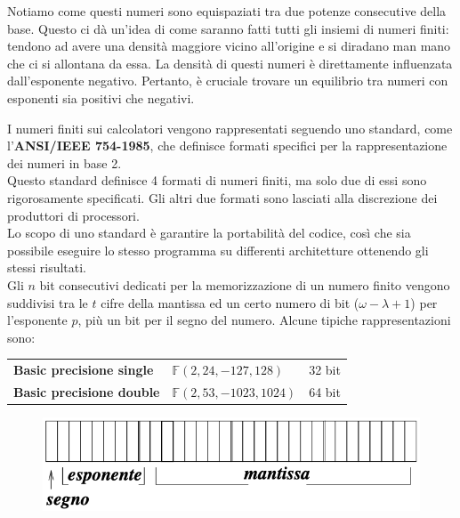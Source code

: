 \documentclass{article}
\begin{document}
\begin{example}
\begin{center}
    \end{center}
    Notiamo come questi numeri sono equispaziati tra due potenze consecutive
    della base. Questo ci dà un'idea di come saranno fatti tutti gli insiemi di
    numeri finiti: tendono ad avere una densità maggiore vicino all'origine e si
    diradano man mano che ci si allontana da essa.
    La densità di questi numeri è direttamente influenzata dall'esponente
    negativo. Pertanto, è cruciale trovare un equilibrio tra numeri con
    esponenti sia positivi che negativi.
\end{example}
I numeri finiti sui calcolatori vengono rappresentati seguendo uno standard,
come l'\textbf{ANSI/IEEE 754-1985}, che definisce formati specifici per la
rappresentazione dei numeri in base 2.\\ 
Questo standard definisce 4 formati di numeri finiti, ma solo due di essi sono
rigorosamente specificati. Gli altri due formati sono lasciati alla discrezione
dei produttori di processori.\\ 
Lo scopo di uno standard è garantire la portabilità del codice, così che sia
possibile eseguire lo stesso programma su differenti architetture ottenendo gli
stessi risultati.\\ 
Gli $n$ bit consecutivi dedicati per la memorizzazione di un numero finito
vengono suddivisi tra le $t$ cifre della mantissa ed un certo numero di bit
($\omega-\lambda+1$) per l'esponente $p$, più un bit per il segno del numero.
Alcune tipiche rappresentazioni sono:
\begin{center}
    \begin{tabular} {lll} 
        \textbf{Basic precisione single} & $\mathbb{F}(2,24,-127,128)$ & 32 bit\\ 
        \textbf{Basic precisione double} & $\mathbb{F}(2,53,-1023,1024)$ & 64 bit\\ 
    \end{tabular}
\end{center}
\begin{figure}[!ht]
    \includegraphics[width=0.5\linewidth]{images/IEEE.png}
    \centering
\end{figure}
\end{document}
